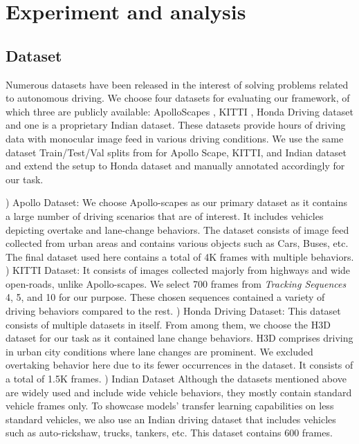 \documentclass[letterpaper, 10 pt, conference]{ieeeconf}
\begin{document}
\section{Experiment and analysis}
\subsection{Dataset}
Numerous datasets have been released in the interest of solving problems related to autonomous driving. We choose four datasets for evaluating our framework, of which three are publicly available: ApolloScapes \cite{huang2018apolloscape}, KITTI \cite{Geiger2012CVPR}, Honda Driving dataset \cite{360LiDARTracking_ICRA_2019} and one is a proprietary Indian dataset. These datasets provide hours of driving data with monocular image feed in various driving conditions. We use the same dataset Train/Test/Val splits from \cite{mylavarapu2020accurate} for Apollo Scape, KITTI, and Indian dataset and extend the setup to Honda dataset and manually annotated accordingly for our task. 

) Apollo Dataset: 
We choose Apollo-scapes as our primary dataset as it contains a large number of driving scenarios that are of interest. It includes vehicles depicting overtake and lane-change behaviors. The dataset consists of image feed collected from urban areas and contains various objects such as Cars, Buses, etc. The final dataset used here contains a total of 4K frames with multiple behaviors.
) KITTI Dataset:
It consists of images collected majorly from highways and wide open-roads, unlike Apollo-scapes. We select 700 frames from \textit{Tracking Sequences} 4, 5, and 10 for our purpose. These chosen sequences contained a variety of driving behaviors compared to the rest.
) Honda Driving Dataset:
This dataset consists of multiple datasets in itself. From among them, we choose the H3D dataset for our task as it contained lane change behaviors. H3D comprises driving in urban city conditions where lane changes are prominent. We excluded overtaking behavior here due to its fewer occurrences in the dataset. It consists of a total of 1.5K frames.
) Indian Dataset
Although the datasets mentioned above are widely used and include wide vehicle behaviors, they mostly contain standard vehicle frames only. To showcase models' transfer learning capabilities on less standard vehicles, we also use an Indian driving dataset that includes vehicles such as auto-rickshaw, trucks, tankers, etc. This dataset contains 600 frames.
\end{document}
